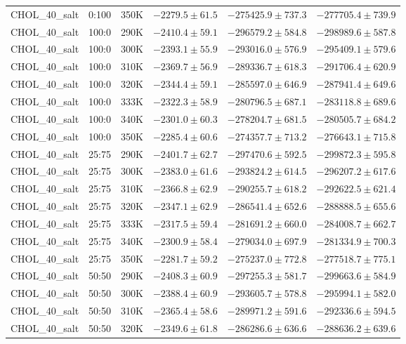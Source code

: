 \begin{longtable}{|c|c|c|c|c|c|}
CHOL\_40\_salt & 0:100 & 350K & $-2279.5 \pm 61.5$ & $-275425.9 \pm 737.3$ & $-277705.4 \pm 739.9$ \\
CHOL\_40\_salt & 100:0 & 290K & $-2410.4 \pm 59.1$ & $-296579.2 \pm 584.8$ & $-298989.6 \pm 587.8$ \\
CHOL\_40\_salt & 100:0 & 300K & $-2393.1 \pm 55.9$ & $-293016.0 \pm 576.9$ & $-295409.1 \pm 579.6$ \\
CHOL\_40\_salt & 100:0 & 310K & $-2369.7 \pm 56.9$ & $-289336.7 \pm 618.3$ & $-291706.4 \pm 620.9$ \\
CHOL\_40\_salt & 100:0 & 320K & $-2344.4 \pm 59.1$ & $-285597.0 \pm 646.9$ & $-287941.4 \pm 649.6$ \\
CHOL\_40\_salt & 100:0 & 333K & $-2322.3 \pm 58.9$ & $-280796.5 \pm 687.1$ & $-283118.8 \pm 689.6$ \\
CHOL\_40\_salt & 100:0 & 340K & $-2301.0 \pm 60.3$ & $-278204.7 \pm 681.5$ & $-280505.7 \pm 684.2$ \\
CHOL\_40\_salt & 100:0 & 350K & $-2285.4 \pm 60.6$ & $-274357.7 \pm 713.2$ & $-276643.1 \pm 715.8$ \\
CHOL\_40\_salt & 25:75 & 290K & $-2401.7 \pm 62.7$ & $-297470.6 \pm 592.5$ & $-299872.3 \pm 595.8$ \\
CHOL\_40\_salt & 25:75 & 300K & $-2383.0 \pm 61.6$ & $-293824.2 \pm 614.5$ & $-296207.2 \pm 617.6$ \\
CHOL\_40\_salt & 25:75 & 310K & $-2366.8 \pm 62.9$ & $-290255.7 \pm 618.2$ & $-292622.5 \pm 621.4$ \\
CHOL\_40\_salt & 25:75 & 320K & $-2347.1 \pm 62.9$ & $-286541.4 \pm 652.6$ & $-288888.5 \pm 655.6$ \\
CHOL\_40\_salt & 25:75 & 333K & $-2317.5 \pm 59.4$ & $-281691.2 \pm 660.0$ & $-284008.7 \pm 662.7$ \\
CHOL\_40\_salt & 25:75 & 340K & $-2300.9 \pm 58.4$ & $-279034.0 \pm 697.9$ & $-281334.9 \pm 700.3$ \\
CHOL\_40\_salt & 25:75 & 350K & $-2281.7 \pm 59.2$ & $-275237.0 \pm 772.8$ & $-277518.7 \pm 775.1$ \\
CHOL\_40\_salt & 50:50 & 290K & $-2408.3 \pm 60.9$ & $-297255.3 \pm 581.7$ & $-299663.6 \pm 584.9$ \\
CHOL\_40\_salt & 50:50 & 300K & $-2388.4 \pm 60.9$ & $-293605.7 \pm 578.8$ & $-295994.1 \pm 582.0$ \\
CHOL\_40\_salt & 50:50 & 310K & $-2365.4 \pm 58.6$ & $-289971.2 \pm 591.6$ & $-292336.6 \pm 594.5$ \\
CHOL\_40\_salt & 50:50 & 320K & $-2349.6 \pm 61.8$ & $-286286.6 \pm 636.6$ & $-288636.2 \pm 639.6$ \\

\end{longtable}
